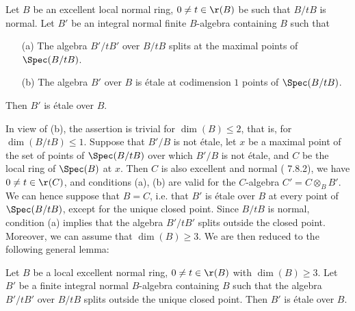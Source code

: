 \begin{lemma}
Let $B$ be an excellent local normal ring, $0\neq t\in\r(B)$ be such that $B/tB$ is normal. Let $B'$ be an integral normal finite $B$-algebra containing $B$ such that
\begin{enumerate}
    \item[(a)] The algebra $B'/tB'$ over $B/tB$ splits at the maximal points of $\Spec(B/tB)$.
    \item[(b)] The algebra $B'$ over $B$ is \'etale at codimension $1$ points of $\Spec(B/tB)$.
\end{enumerate}
Then $B'$ is \'etale over $B$.
\end{lemma}

In view of (b), the assertion is trivial for $\dim(B)\leq 2$, that is, for $\dim(B/tB)\leq 1$. Suppose that $B'/B$ is not \'etale, let $x$ be a maximal point of the set of points of $\Spec(B/tB)$ over which $B'/B$ is not \'etale, and $C$ be the local ring of $\Spec(B)$ at $x$. Then $C$ is also excellent and normal (\cite{EGA4-3} 7.8.2), we have $0\neq t\in\r(C)$, and conditions (a), (b) are valid for the $C$-algebra $C'=C\otimes_BB'$. We can hence suppose that $B=C$, i.e. that $B'$ is \'etale over $B$ at every point of $\Spec(B/tB)$, except for the unique closed point. Since $B/tB$ is normal, condition (a) implies that the algebra $B'/tB'$ splits outside the closed point. Moreover, we can assume that $\dim(B)\geq 3$. We are then reduced to the following general lemma:

\begin{lemma}\label{scheme etale over punctured open prop}
Let $B$ be a local excellent normal ring, $0\neq t\in\r(B)$ with $\dim(B)\geq 3$. Let $B'$ be a finite integral normal $B$-algebra containing $B$ such that the algebra $B'/tB'$ over $B/tB$ splits outside the unique closed point. Then $B'$ is \'etale over $B$.
\end{lemma}

